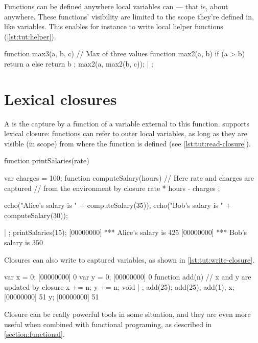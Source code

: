 Functions can be defined anywhere local variables can --- that is,
about anywhere. These functions' visibility are limited to the scope
they're defined in, like variables. This enables for instance to write
local helper functions (\autoref{lst:tut:helper}).

\begin{urbiscript}[caption=Local helper function, label=lst:tut:helper]
function max3(a, b, c) // Max of three values
{
  function max2(a, b)
  {
    if (a > b)
      return a
    else
      return b
  };
  max2(a, max2(b, c));
} | {};
\end{urbiscript}

\section{Lexical closures}

A  is the capture by a function of a variable external to this
function. \us supports lexical closure: functions can refer to outer
local variables, as long as they are visible (in scope) from where
the function is defined (see \autoref{lst:tut:read-closure}).

\begin{urbiscript}[caption=Capturing variables with lexical closures,
label=lst:tut:read-closure]
function printSalaries(rate)
{
  var charges = 100;
  function computeSalary(hours)
  {
    // Here rate and charges are captured
    // from the environment by closure
    rate * hours - charges
  };

  echo("Alice's salary is " + computeSalary(35));
  echo("Bob's salary is " + computeSalary(30));
} | {};
printSalaries(15);
[00000000] *** Alice's salary is 425
[00000000] *** Bob's salary is 350
\end{urbiscript}

Closures can also write to captured variables, as shown in
\autoref{lst:tut:write-closure}.

\begin{urbiscript}[caption=Updating captured variables,
label=lst:tut:write-closure]
var x = 0;
[00000000] 0
var y = 0;
[00000000] 0
function add(n)
{
  // x and y are updated by closure
  x += n;
  y += n;
  void
} | {};
add(25);
add(25);
add(1);
x;
[00000000] 51
y;
[00000000] 51
\end{urbiscript}

Closure can be really powerful tools in some situation, and they are
even more useful when combined with functional programing, as
described in \autoref{section:functional}.

